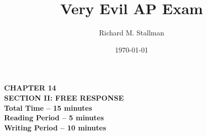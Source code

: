 

\setlength{\footskip}{1in}  %

\pagestyle{fancy}




\title{Very Evil AP Exam}
\author{Richard M. Stallman}
\date{\today}
\maketitle





\onecolumn

\begin{adjustwidth}{1in}{1in}
  \begin{center}
    \textbf{
      CHAPTER 14 \\
      \medskip
      SECTION II: FREE RESPONSE \\
      \medskip
      Total Time -- 15 minutes \\
      \medskip
      Reading Period -- 5 minutes \\
      \medskip
      Writing Period -- 10 minutes}
  \end{center}
\end{adjustwidth}

\bigskip


\onecolumn
\sffamily
\bfseries



\large




